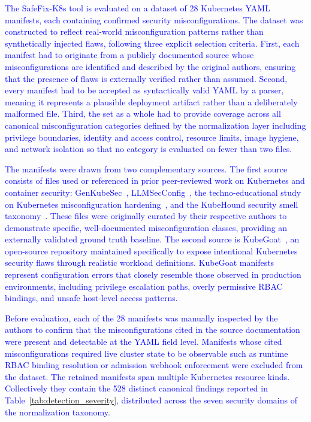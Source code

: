 \documentclass[preprint,12pt]{elsarticle}
\newcommand{\new}[1]{\textcolor{blue}{#1}}
\begin{document}
\new{The SafeFix-K8s tool is evaluated on a dataset of 28 Kubernetes YAML 
manifests, each containing confirmed security misconfigurations. The dataset 
was constructed to reflect real-world misconfiguration patterns rather than 
synthetically injected flaws, following three explicit selection criteria. 
First, each manifest had to originate from a publicly documented source 
whose misconfigurations are identified and described by the original authors, 
ensuring that the presence of flaws is externally verified rather than 
assumed. Second, every manifest had to be accepted as syntactically valid 
YAML by a parser, meaning it represents a plausible deployment artifact 
rather than a deliberately malformed file. Third, the set as a whole had to 
provide coverage across all canonical misconfiguration categories defined by 
the normalization layer including privilege boundaries, identity and 
access control, resource limits, image hygiene, and network isolation so 
that no category is evaluated on fewer than two files.}

\new{The manifests were drawn from two complementary sources. The first 
source consists of files used or referenced in prior peer-reviewed work on 
Kubernetes and container security: GenKubeSec~\cite{malul2024genkubesec}, 
LLMSecConfig~\cite{ye2025llmsecconfig}, the techno-educational study on 
Kubernetes misconfiguration hardening~\cite{shamim2024technoeducational}, 
and the KubeHound security smell taxonomy~\cite{dellimmagine2023kubehound}. 
These files were originally curated by their respective authors to 
demonstrate specific, well-documented misconfiguration classes, providing 
an externally validated ground truth baseline. The second source is 
KubeGoat~\cite{madhuakula_kubernetes_goat}, an open-source repository 
maintained specifically to expose intentional Kubernetes security flaws 
through realistic workload definitions. KubeGoat manifests represent 
configuration errors that closely resemble those observed in production 
environments, including privilege escalation paths, overly permissive 
RBAC bindings, and unsafe host-level access patterns.}


\new{Before evaluation, each of the 28 manifests was manually inspected by 
the authors to confirm that the misconfigurations cited in the source 
documentation were present and detectable at the YAML field level. Manifests 
whose cited misconfigurations required live cluster state to be observable 
such as runtime RBAC binding resolution or admission webhook enforcement 
were excluded from the dataset. The retained manifests span multiple 
Kubernetes resource kinds. Collectively they contain the 528 distinct canonical findings reported in Table~\ref{tab:detection_severity}, distributed across the seven security domains of the normalization taxonomy. }
\end{document}
